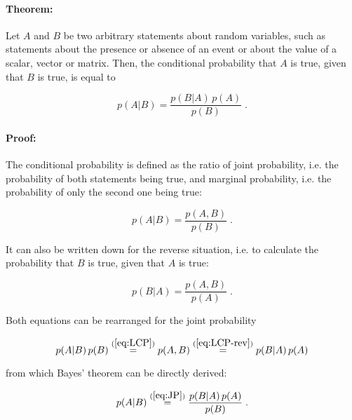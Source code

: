 

\setcounter{equation}{0}



\paragraph{Theorem:}

Let $A$ and $B$ be two arbitrary statements about random variables, such as statements about the presence or absence of an event or about the value of a scalar, vector or matrix. Then, the conditional probability that $A$ is true, given that $B$ is true, is equal to

\begin{equation} \label{eq:BT}
p(A|B) = \frac{p(B|A) \, p(A)}{p(B)} \; .
\end{equation}


\paragraph{Proof:} The conditional probability is defined as the ratio of joint probability, i.e. the probability of both statements being true, and marginal probability, i.e. the probability of only the second one being true:

\begin{equation} \label{eq:LCP}
p(A|B) = \frac{p(A,B)}{p(B)} \; .
\end{equation}

It can also be written down for the reverse situation, i.e. to calculate the probability that $B$ is true, given that $A$ is true:

\begin{equation} \label{eq:LCP-rev}
p(B|A) = \frac{p(A,B)}{p(A)} \; .
\end{equation}

Both equations can be rearranged for the joint probability

\begin{equation} \label{eq:JP}
p(A|B) \, p(B) \overset{(\ref{eq:LCP})}{=} p(A,B) \overset{(\ref{eq:LCP-rev})}{=} p(B|A) \, p(A)
\end{equation}

from which Bayes' theorem can be directly derived:

\begin{equation} \label{eq:BT-proof}
p(A|B) \overset{(\ref{eq:JP})}{=} \frac{p(B|A) \, p(A)}{p(B)} \; .
\end{equation}

